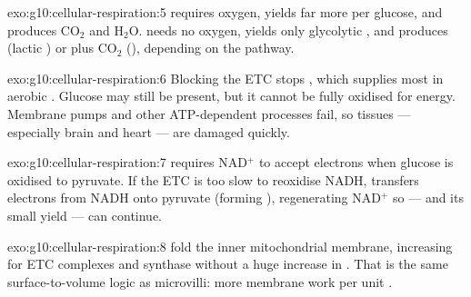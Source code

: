 \begin{solution}{exo:g10:cellular-respiration:5}
 requires oxygen, yields far more  per glucose, and
produces $\mathrm{CO_2}$ and $\mathrm{H_2O}$.  needs no oxygen,
yields only glycolytic , and produces  (lactic ) or
 plus $\mathrm{CO_2}$ (), depending on the
pathway.
\end{solution}

\begin{solution}{exo:g10:cellular-respiration:6}
Blocking the ETC stops , which supplies most  in
aerobic . Glucose may still be present, but it cannot be fully oxidised
for energy. Membrane pumps and other ATP-dependent processes fail, so tissues
--- especially brain and heart --- are damaged quickly.
\end{solution}

\begin{solution}{exo:g10:cellular-respiration:7}
 requires NAD$^+$ to accept electrons when glucose is oxidised to
pyruvate. If the ETC is too slow to reoxidise NADH,  transfers
electrons from NADH onto pyruvate (forming ), regenerating NAD$^+$ so
 --- and its small  yield --- can continue.
\end{solution}

\begin{solution}{exo:g10:cellular-respiration:8}
 fold the inner mitochondrial membrane, increasing  for
ETC complexes and  synthase without a huge increase in  .
That is the same surface-to-volume logic as microvilli: more membrane work per
unit .
\end{solution}

